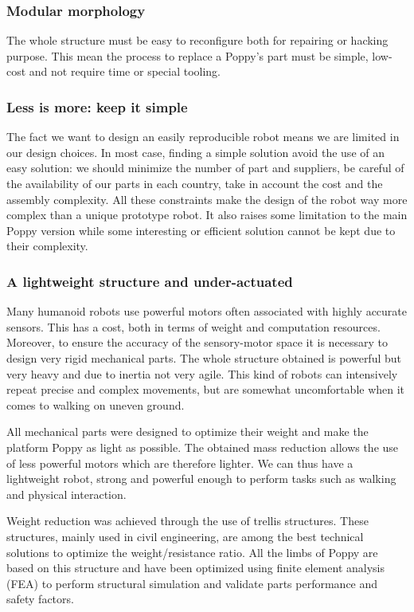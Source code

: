 \subsubsection{Modular morphology} %
The whole structure must be easy to reconfigure both for repairing or hacking purpose. This mean the process to replace a Poppy's part must be simple, low-cost and not require time or special tooling.


\subsubsection{Less is more: keep it simple}

The fact we want to design an easily reproducible robot means we are limited in our design choices. In most case, finding a simple solution avoid the use of an easy solution: we should minimize the number of part and suppliers, be careful of the availability of our parts in each country, take in account the cost and the assembly complexity. All these constraints make the design of the robot way more complex than a unique prototype robot.
It also raises some limitation to the main Poppy version while some interesting or efficient solution cannot be kept due to their complexity.


\subsubsection{A lightweight structure and under-actuated} %

Many humanoid robots use powerful motors often associated with highly accurate sensors. This has a cost, both in terms of weight and computation resources. Moreover, to ensure the accuracy of the sensory-motor space it is necessary to design very rigid mechanical parts. The whole structure obtained is powerful but very heavy and due to inertia not very agile. This kind of robots can intensively repeat precise and complex movements, but are somewhat uncomfortable when it comes to walking on uneven ground.

All mechanical parts were designed to optimize their weight and make the platform Poppy as light as possible. The obtained mass reduction allows the use of less powerful motors which are therefore lighter. We can thus have a lightweight robot, strong and powerful enough to perform tasks such as walking and physical interaction.

Weight reduction was achieved through the use of trellis structures. These structures, mainly used in civil engineering, are among the best technical solutions to optimize the weight/resistance ratio. All the limbs of Poppy are based on this structure and have been optimized using finite element analysis (FEA) to perform structural simulation and validate parts performance and safety factors.

